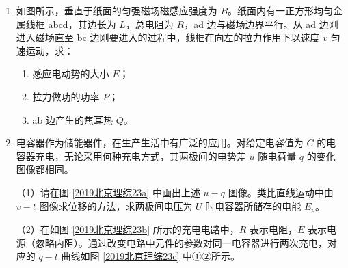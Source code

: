 \documentclass[\gkver]{gaokaozhenti}
\begin{document}
\begin{enumerate}
\item
如图所示，垂直于纸面的匀强磁场磁感应强度为 $B$。纸面内有一正方形均匀金属线框 abcd，其边长为 $L$，总电阻为 $R$，ad 边与磁场边界平行。从 ad 边刚进入磁场直至 bc 边刚要进入的过程中，线框在向左的拉力作用下以速度 $v$ 匀速运动，求：

\begin{enumerate}
	\item
	感应电动势的大小 $E$；
	\item
	拉力做功的功率 $P$；
	\item
	ab 边产生的焦耳热 $Q$。
\end{enumerate}

\onepicture[align=right, w=3.72cm]{}


\item
电容器作为储能器件，在生产生活中有广泛的应用。对给定电容值为 $C$ 的电容器充电，无论采用何种充电方式，其两极间的电势差 $u$ 随电荷量 $q$ 的变化图像都相同。

（1）请在图 \ref{2019北京理综23a} 中画出上述 $u-q$ 图像。类比直线运动中由 $v-t$ 图像求位移的方法，求两极间电压为 $U$ 时电容器所储存的电能 $E_p$。

（2）在如图 \ref{2019北京理综23b} 所示的充电电路中，$R$ 表示电阻，$E$ 表示电源（忽略内阻）。通过改变电路中元件的参数对同一电容器进行两次充电，对应的 $q-t$ 曲线如图 \ref{2019北京理综23c} 中①②所示。


\end{enumerate}
\end{document}
